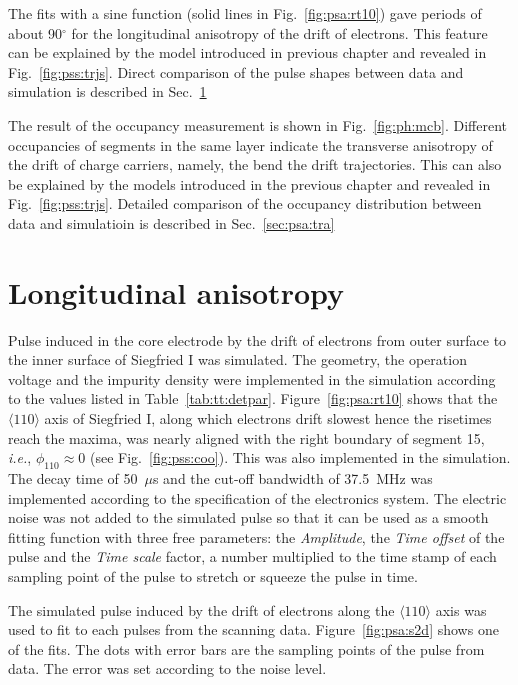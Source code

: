 The fits with a sine function (solid lines in Fig.~\ref{fig:psa:rt10}) gave periods of about 90$^{\circ}$ for the longitudinal anisotropy of the drift of electrons. This feature can be explained by the model introduced in previous chapter and revealed in Fig.~\ref{fig:pss:trjs}. Direct comparison of the pulse shapes between data and simulation is described in Sec.~\ref{sec:psa:lon}

The result of the occupancy measurement is shown in Fig.~\ref{fig:ph:mcb}. Different occupancies of segments in the same layer indicate the transverse anisotropy of the drift of charge carriers, namely, the bend the drift trajectories. This can also be explained by the models introduced in the previous chapter and revealed in Fig.~\ref{fig:pss:trjs}. Detailed comparison of the occupancy distribution between data and simulatioin is described in Sec.~\ref{sec:psa:tra}

\section{Longitudinal anisotropy}
\label{sec:psa:lon}
Pulse induced in the core electrode by the drift of electrons from outer surface to the inner surface of Siegfried I was simulated. The geometry, the operation voltage and the impurity density were implemented in the simulation according to the values listed in Table~\ref{tab:tt:detpar}. Figure~\ref{fig:psa:rt10} shows that the $\langle 110 \rangle$ axis of Siegfried I, along which electrons drift slowest hence the risetimes reach the maxima, was nearly aligned with the right boundary of segment 15, \textit{i.e.}, $\phi_{110} \approx 0$ (see Fig.~\ref{fig:pss:coo}). This was also implemented in the simulation. The decay time of 50~$\mu$s and the cut-off bandwidth of 37.5~MHz was implemented according to the specification of the electronics system. The electric noise was not added to the simulated pulse so that it can be used as a smooth fitting function with three free parameters: the \emph{Amplitude}, the \emph{Time offset} of the pulse and the \emph{Time scale} factor, a number multiplied to the time stamp of each sampling point of the pulse to stretch or squeeze the pulse in time.

The simulated pulse induced by the drift of electrons along the $\langle 110 \rangle$ axis was used to fit to each pulses from the scanning data. Figure~\ref{fig:psa:s2d} shows one of the fits. The dots with error bars are the sampling points of the pulse from data. The error was set according to the noise level.

